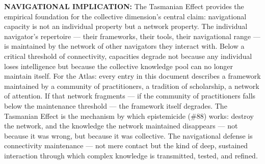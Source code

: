 \textbf{NAVIGATIONAL IMPLICATION:} The Tasmanian Effect provides the empirical foundation for the collective dimension's central claim: navigational capacity is not an individual property but a network property. The individual navigator's repertoire — their frameworks, their tools, their navigational range — is maintained by the network of other navigators they interact with. Below a critical threshold of connectivity, capacities degrade not because any individual loses intelligence but because the collective knowledge pool can no longer maintain itself. For the Atlas: every entry in this document describes a framework maintained by a community of practitioners, a tradition of scholarship, a network of attention. If that network fragments — if the community of practitioners falls below the maintenance threshold — the framework itself degrades. The Tasmanian Effect is the mechanism by which epistemicide (\#88) works: destroy the network, and the knowledge the network maintained disappears — not because it was wrong, but because it was collective. The navigational defense is connectivity maintenance — not mere contact but the kind of deep, sustained interaction through which complex knowledge is transmitted, tested, and refined.


\bigskip\noindent\makebox[\textwidth]{\color{rulegray}\rule{5cm}{0.3pt}}\bigskip
